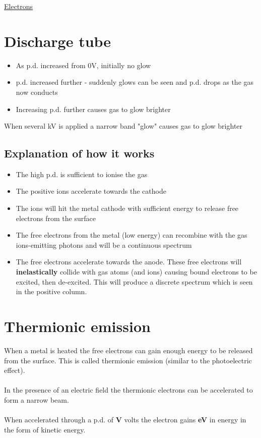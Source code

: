 \documentclass[12pt]{article}
\begin{document}
\begin{center}
\underline{\huge Electrons}
\end{center}
\section{Discharge tube}
\begin{itemize}
\item As p.d. increased from 0V, initially no glow
\item p.d. increased further - suddenly glows can be seen and p.d. drops as the gas now conducts
\item Increasing p.d. further causes gas to glow brighter
\end{itemize}
When several kV is applied a narrow band "glow" causes gas to glow brighter
\subsection{Explanation of how it works}
\begin{itemize}
\item The high p.d. is sufficient to ionise the gas
\item The positive ions accelerate towards the cathode
\item The ions will hit the metal cathode with sufficient energy to release free electrons from the surface
\item The free electrons from the metal (low energy) can recombine with the gas ions-emitting photons and will be a continuous spectrum
\item The free electrons accelerate towards the anode. These free electrons will \textbf{inelastically} collide with gas atoms (and ions) causing bound electrons to be excited, then de-excited. This will produce a discrete spectrum which is seen in the positive column.
\end{itemize}
\section{Thermionic emission}
When a metal is heated the free electrons can gain enough energy to be released from the surface. This is called thermionic emission (similar to the photoelectric effect).\\
\\
In the presence of an electric field the thermionic electrons can be accelerated to form a narrow beam.\\
\\
When accelerated through a p.d. of \textbf{V} volts the electron gains \textbf{eV} in energy in the form of kinetic energy.
\newpage
\end{document}
